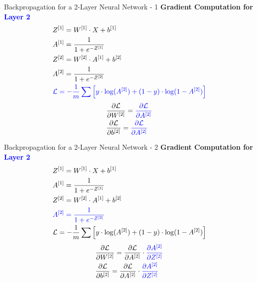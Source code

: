 \documentclass[aspectratio=169]{beamer}
\begin{document}
%
%
\begin{frame}{Backpropagation for a 2-Layer Neural Network - 1}
\textbf{Gradient Computation for \textcolor{blue}{Layer 2}}
\begin{align*}
&Z^{[1]} = W^{[1]} \cdot X + b^{[1]}\\
&A^{[1]} = \frac{1}{1 + e^{-Z^{[1]}}}      \\
&Z^{[2]} = W^{[2]} \cdot A^{[1]} + b^{[2]} \\
&A^{[2]} = \frac{1}{1 + e^{-Z^{[2]}}} \\
&\textcolor{blue}{\mathcal{L} = -\frac{1}{m} \sum \left[ y \cdot \log(A^{[2]}) + (1 - y) \cdot \log(1 - A^{[2]}) \right]}
\end{align*}
\begin{align*}
&\frac{\partial \mathcal{L}}{\partial W^{[2]}} = \textcolor{blue}{\frac{\partial \mathcal{L}}{\partial A^{[2]}}} 
\\
&\frac{\partial \mathcal{L}}{\partial b^{[2]}} = \textcolor{blue}{\frac{\partial \mathcal{L}}{\partial A^{[2]}}} 
\end{align*}
\end{frame}
%
%
\begin{frame}{Backpropagation for a 2-Layer Neural Network - 2}
\textbf{Gradient Computation for \textcolor{blue}{Layer 2}}
\begin{align*}
&Z^{[1]} = W^{[1]} \cdot X + b^{[1]}\\
&A^{[1]} = \frac{1}{1 + e^{-Z^{[1]}}}      \\
&Z^{[2]} = W^{[2]} \cdot A^{[1]} + b^{[2]} \\
&\textcolor{blue}{A^{[2]} = \frac{1}{1 + e^{-Z^{[2]}}}} \\
&\mathcal{L} = -\frac{1}{m} \sum \left[ y \cdot \log(A^{[2]}) + (1 - y) \cdot \log(1 - A^{[2]}) \right]
\end{align*}
\begin{align*}
&\frac{\partial \mathcal{L}}{\partial W^{[2]}} = \frac{\partial \mathcal{L}}{\partial A^{[2]}} \cdot \textcolor{blue}{\frac{\partial A^{[2]}}{\partial Z^{[2]}}} 
\\
&\frac{\partial \mathcal{L}}{\partial b^{[2]}} = \frac{\partial \mathcal{L}}{\partial A^{[2]}} \cdot \textcolor{blue}{\frac{\partial A^{[2]}}{\partial Z^{[2]}}} 
\end{align*}
\end{frame}
%
\end{document}
